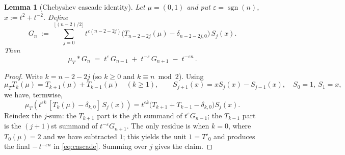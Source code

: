 \documentclass[12pt]{article}
\newtheorem{lemma}[theorem]{Lemma}
\begin{document}
\begin{lemma}[Chebyshev cascade identity]\label{lem:cascade}
Let $\mu=(0,1)$ and put $\varepsilon=\operatorname{sgn}(n)$, $x:=t^2+t^{-2}$.
Define
\[
G_n \;:=\;\sum_{j=0}^{\lfloor (n-2)/2\rfloor}
t^{\varepsilon(n-2-2j)}\Big(T_{n-2-2j}(\mu)-\delta_{n-2-2j,0}\Big)\,S_j(x).
\]
Then
\begin{equation}\label{eq:cascade}
\mu_T\ast G_n \;=\; t^{\varepsilon}\,G_{n-1} \;+\; t^{-\varepsilon}\,G_{n+1} \;-\; t^{-\varepsilon n}\,.
\end{equation}
\end{lemma}

\begin{proof}
Write $k=n-2-2j$ (so $k\ge0$ and $k\equiv n\bmod 2$). Using
\[
\mu_T T_k(\mu)=T_{k+1}(\mu)+T_{k-1}(\mu)\quad(k\ge1),\qquad
S_{j+1}(x)=xS_j(x)-S_{j-1}(x),\quad S_0=1,\ S_1=x,
\]
we have, termwise,
\[
\mu_T\!\left(t^{\varepsilon k}\,[T_k(\mu)-\delta_{k,0}]\,S_j(x)\right)
= t^{\varepsilon k}\big(T_{k+1}+T_{k-1}-\delta_{k,0}\big)S_j(x).
\]
Reindex the $j$-sum: the $T_{k+1}$ part is the $j$th summand of $t^{\varepsilon}G_{n-1}$; the $T_{k-1}$ part
is the $(j+1)$st summand of $t^{-\varepsilon}G_{n+1}$. The only residue is when $k=0$,
where $T_0(\mu)=2$ and we have subtracted $1$; this yields the unit $1=T'_0$ and produces the final
$-\,t^{-\varepsilon n}$ in \eqref{eq:cascade}. Summing over $j$ gives the claim.
\end{proof}
\end{document}
